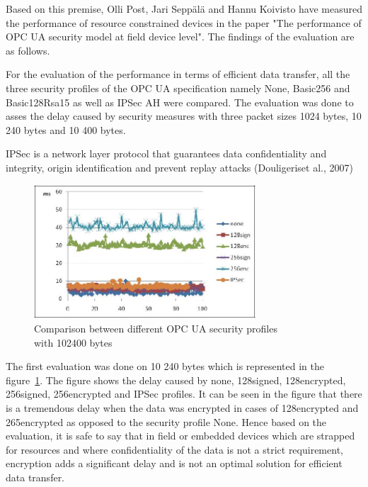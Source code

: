 \documentclass[conference]{IEEEtran}
\begin{document}
Based on this premise, Olli Post, Jari Sepp\"al\"a and Hannu Koivisto have measured the performance of resource constrained devices in the paper "The performance of OPC UA security model at field device level". The findings of the evaluation are as follows. \cite{post2009performance}

For the evaluation of the performance in terms of efficient data transfer, all the three security profiles of the OPC UA specification namely None, Basic256 and Basic128Rsa15 as well as IPSec AH were compared. The evaluation was done to asses the delay caused by security measures with three packet sizes 1024 bytes, 10 240 bytes and 10 400 bytes.

IPSec is a network layer protocol that guarantees data confidentiality and integrity, origin identification and prevent replay attacks (Douligeriset al., 2007)\cite{post2009performance}

\begin{figure}[ht]
\centering
\includegraphics[height=50mm]{Figures/security_fig2}\quad
\caption[Subfigure example]{\label{f:security_fig2}Comparison between different OPC UA security profiles\\ with 102400 bytes \cite{post2009performance}}
\end{figure}

The first evaluation was done on 10 240 bytes which is represented in the figure~\ref{f:security_fig2}. The figure shows the delay caused by none, 128signed, 128encrypted, 256signed, 256encrypted and IPSec profiles. It can be seen in the figure that there is a tremendous delay when the data was encrypted in cases of 128encrypted and 265encrypted as opposed to the security profile None. Hence based on the evaluation, it is safe to say that in field or embedded devices which are strapped for resources and where confidentiality of the data is not a strict requirement, encryption adds a significant delay and is not an optimal solution for efficient data transfer. 
\end{document}
